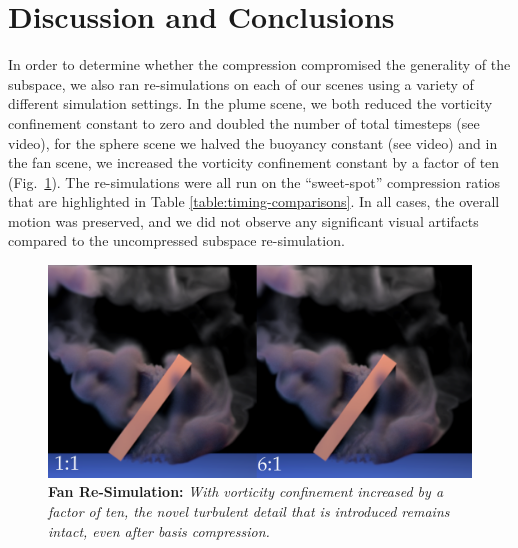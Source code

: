 \section{Discussion and Conclusions}

In order to determine whether the compression compromised the generality of the subspace, we also ran re-simulations \cite{Kim2013} on each of our scenes using a variety of different simulation settings. In the plume scene, we both reduced the vorticity confinement constant to zero and doubled the number of total timesteps (see video), for the sphere scene we halved the buoyancy constant (see video) and in the fan scene, we increased the vorticity confinement constant by a factor of ten (Fig.~\ref{fig:fanResim}). The re-simulations were all run on the ``sweet-spot'' compression ratios that are highlighted in Table \ref{table:timing-comparisons}. In all cases, the overall motion was preserved, and we did not observe any significant visual artifacts compared to the uncompressed subspace re-simulation.

\begin{figure}[h]
\includegraphics[width=\columnwidth]{chap4/figures/paddle_resim.png}
\vspace*{-1em}
\caption{\textbf{Fan Re-Simulation:} {\em With vorticity confinement increased by a factor of ten, the novel turbulent detail that is introduced remains intact, even after basis compression.}}
\label{fig:fanResim}
\end{figure}

